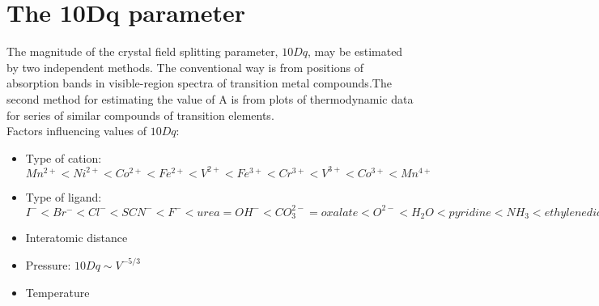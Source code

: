 \documentclass{article}
\begin{document}
	\section{The 10Dq parameter}
		The magnitude of the crystal field splitting parameter, $10Dq$, may be estimated by two independent methods. The conventional way is from positions of absorption bands in visible-region spectra of transition metal compounds.The second method for estimating the value of A is from plots of thermodynamic data for series of similar compounds of transition elements.\\

		Factors influencing values of $10Dq$:

		\begin{itemize}
			\item Type of cation: $Mn^{2+} < Ni^{2+} < Co^{2+} < Fe^{2+} < V^{2+} < Fe^{3+} < Cr^{3+} < V^{3+} < Co^{3+} < Mn^{4+}$
			\item Type of ligand: $I^{-} < Br^{-} < Cl^{-} < SCN^{-} < F^{-} < urea = OH^{-} < CO_{3}^{2-} = oxalate < O^{2-} < H_{2}O < pyridine < NH_{3} < ethylene diamene < SO_{3}^{2-} < NO_{2}^{-} < HS^{-} < S^{2-} < CN^{-}$
			\item Interatomic distance
			\item Pressure: $10Dq \sim V^{-5/3}$
			\item Temperature
		\end{itemize}
\end{document}

